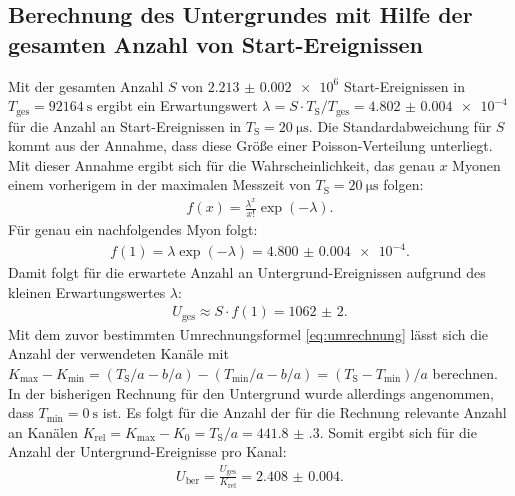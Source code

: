 \subsection{Berechnung des Untergrundes mit Hilfe der gesamten Anzahl von Start-Ereignissen}
\label{subsec:Berechnung}
Mit der gesamten Anzahl $S$ von $\num{2.213(2)e6}$ Start-Ereignissen in $T_\text{ges}=\SI{92164}{\second}$ ergibt ein Erwartungswert $\lambda=S \cdot T_\text{S}/T_\text{ges}=\num{4.802(4)e-4}$ für die Anzahl an Start-Ereignissen in $T_\text{S}=\SI{20}{\micro\second}$. Die Standardabweichung für $S$ kommt aus der Annahme, dass diese Größe einer Poisson-Verteilung unterliegt. Mit dieser Annahme ergibt sich für die Wahrscheinlichkeit, das genau $x$ Myonen einem vorherigem in der maximalen Messzeit von $T_\text{S}=\SI{20}{\micro\second}$ folgen: 
\begin{gather*}
f(x)=\frac{\lambda^x}{x!}\exp(-\lambda).
\end{gather*}
Für genau ein nachfolgendes Myon folgt:
\begin{gather*}
f(1)=\lambda\exp(-\lambda)=\num{4.800(4)e-4}.
\end{gather*}
Damit folgt für die erwartete Anzahl an Untergrund-Ereignissen aufgrund des kleinen Erwartungswertes $\lambda$:
\begin{gather*}
U_\text{ges}\approx S \cdot f(1) =\num{1062(2)}.
\end{gather*}
Mit dem zuvor bestimmten Umrechnungsformel \eqref{eq:umrechnung} lässt sich die Anzahl der verwendeten Kanäle mit $K_\text{max}-K_\text{min}=(T_\text{S}/a -b/a)-(T_\text{min}/a-b/a)= (T_\text{S}-T_\text{min})/a$ berechnen. In der bisherigen Rechnung für den Untergrund wurde allerdings angenommen, dass $T_\text{min} = \SI{0}{\second}$ ist. Es folgt für die Anzahl der für die Rechnung relevante Anzahl an Kanälen $K_\text{rel}=K_\text{max}-K_0= T_\text{S}/a=\num{441.8(3)}$.
Somit ergibt sich für die Anzahl der Untergrund-Ereignisse pro Kanal:
\begin{gather*}
U_\text{ber}=\frac{U_\text{ges}}{K_\text{rel}} =\num{2.408(4)}.
\end{gather*}

